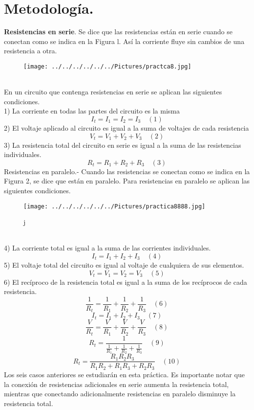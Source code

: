 \documentclass[11pt,a4paper]{article}
\begin{document}
\section{Metodolog\'{i}a.}
\textbf{Resistencias en serie}. Se dice que las resistencias est\'{a}n en serie cuando se conectan como se indica en la Figura l. As\'{i} la corriente fluye sin cambios de una resistencia a otra.
\begin{figure}[hbtp]
\centering
\texttt{[image: ../../../../../../Pictures/practca8.jpg]}
\end{figure}
\\
En un circuito que contenga resistencias en serie se aplican las siguientes condiciones.\\
1) La corriente en todas las partes del circuito es la misma
\[{I}_{t} ={I}_{1}={I}_{2}={I}_{3} \quad (1) \]
2) El voltaje aplicado al circuito es igual a la suma de voltajes de cada resistencia
\[ {V}_{t} = {V}_{1} + {V}_{2} + {V}_{3}  \quad (2) \]
3) La resistencia total del circuito en serie es igual a la suma de las resistencias individuales.
\[{R}_{t} = {R}_{1}+ {R}_{2} + {R}_{3} \quad (3)\]
Resistencias en paralelo.- Cuando las resistencias se conectan como se indica en la Figura 2, se dice que est\'{a}n en paralelo. Para resistencias en paralelo se aplican las siguientes condiciones.
\begin{figure}[hbtp]
\caption{j}
\centering
\texttt{[image: ../../../../../../Pictures/practica8888.jpg]}
\end{figure}
\\
4) La corriente total es igual a la suma de las corrientes individuales.
\[{I}_{t} = {I}_{1} + {I}_{2} + {I}_{3} \quad (4)\]
5) El voltaje total del circuito es igual al voltaje de cualquiera de sus elementos.
\[ {V}_{t} = {V}_{1} = {V}_{2} = {V}_{3} \quad (5) \]
6) El rec\'{i}proco de la resistencia total es igual a la suma de los recíprocos de cada resistencia.
\[\frac{1}{{R}_{t}} = \frac{1}{{R}_{1}}+ \frac{1}{{R}_{2}} + \frac{1}{{R}_{3}} \quad (6) \]
\[{I}_{t} = {I}_{1} + {I}_{2} + {I}_{3} \quad (7) \]
\[\frac{V}{{R}_{t}} = \frac{V}{{R}_{1}}+ \frac{V}{{R}_{2}} + \frac{V}{{R}_{3}} \quad (8)\]
\[{R}_{t}= \frac{1}{\frac{1}{{R}_{1}} + \frac{1}{{R}_{2}} + \frac{1}{{R}_{3}}} \quad (9) \]
\[{R}_{t} = \frac{{R}_{1}{R}_{2} {R}_{3}}{{R}_{1}{R}_{2} + {R}_{1}{R}_{3} + {R}_{2} {R}_{3}} \quad (10) \]
Los seis casos anteriores se estudiar\'{a}n en esta pr\'{a}ctica. Es importante notar que la conexi\'{o}n de resistencias adicionales en serie aumenta la resistencia total, mientras que conectando adicionalmente resistencias en paralelo disminuye la resistencia total.
\end{document}
